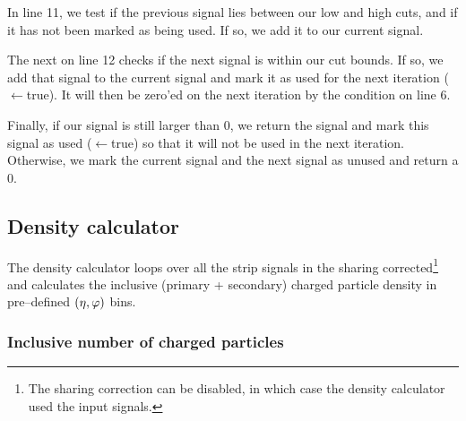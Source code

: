 \documentclass[11pt]{article}
\def\AlwaysText#1{\ifmmode\relax\text{#1}\else #1\fi}
\newcommand{\AbbrName}[1]{\AlwaysText{{\scshape #1}}}
\newcommand{\ESD}{\AbbrName{esd}}
\newcommand{\etaphi}{\ensuremath(\eta,\varphi)}
\begin{document}
In line 11, %
we test if the previous signal lies between our low and
high cuts, and if it has not been marked as being used.  If so, we add
it to our current signal.  

The next  on line 12 %
checks if the next signal is within our
cut bounds.  If so, we add that signal to the current signal and mark
it as used for the next iteration ($\leftarrow$true).  It will then be zero'ed on the next
iteration by the condition on line 6.

Finally, if our signal is still larger than 0, we return the signal
and mark this signal as used ($\leftarrow$true) so that it will not be used in the next
iteration. Otherwise, we mark the current signal and the next signal
as unused and return a 0. 


\subsection{Density calculator}
\label{sec:sub:density_calculator}

The density calculator loops over all the strip signals in the sharing
corrected\footnote{The sharing correction can be disabled, in which
  case the density calculator used the input \ESD{} signals.} \ESD{}
and calculates the inclusive (primary + secondary) charged particle
density in pre--defined $\etaphi$ bins.

\subsubsection{Inclusive number of charged particles} 
\label{sec:sub:sub:eloss_fits}
\end{document}
